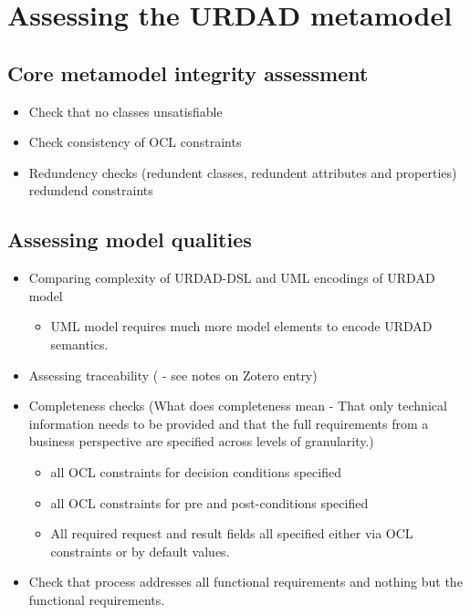 \section{Assessing the URDAD metamodel \label{sec:metamodelAssessment}}




\subsection{Core metamodel integrity assessment}


\begin{itemize}
  \item Check that no classes unsatisfiable
  \item Check consistency of OCL constraints
  \item Redundency checks (redundent classes, redundent attributes and properties) redundend constraints
\end{itemize}


\subsection{Assessing model qualities}

\begin{itemize}
  \item Comparing complexity of URDAD-DSL and UML encodings of URDAD model
    \begin{itemize}
     \item UML model requires much more model elements to encode URDAD semantics.
    \end{itemize}
  \item Assessing traceability (\cite{dick_design_2005} - see notes on Zotero entry)
  \item Completeness checks
(What does completeness mean - That only technical information needs to be provided and that the full requirements
from a business perspective are specified across levels of granularity.)
    \begin{itemize}
     \item all OCL constraints for decision conditions specified
     \item all OCL constraints for pre and post-conditions specified
     \item All required request and result fields all specified either via OCL constraints 
	or by default values.
    \end{itemize}
  \item Check that process addresses all functional requirements and nothing but the functional requirements.
\end{itemize}

